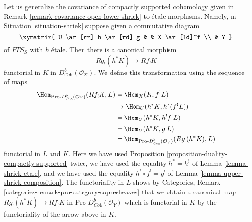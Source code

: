 \begin{remark}
\label{remark-covariance-etale-lower-shriek}
Let us generalize the covariance of compactly supported cohomology
given in Remark \ref{remark-covariance-open-lower-shriek}
to \'etale morphisms. Namely, in Situation \ref{situation-shriek}
suppose given a commutative diagram
$$
\xymatrix{
U \ar[rr]_h \ar[rd]_g & & X \ar[ld]^f \\
& Y
}
$$
of $\textit{FTS}_S$ with $h$ \'etale. Then there is a canonical morphism
$$
Rg_!(h^*K) \longrightarrow Rf_!K
$$
functorial in $K$ in $D^b_{\textit{Coh}}(\mathcal{O}_X)$. We define
this transformation using the sequence of maps
\begin{align*}
\Hom_{\text{Pro-}D^b_{\textit{Coh}}(\mathcal{O}_Y)}(Rf_!K, L)
& =
\Hom_X(K, f^!L) \\
& \to
\Hom_U(h^*K, h^*(f^!L)) \\
& =
\Hom_U(h^*K, h^!f^!L) \\
& =
\Hom_U(h^*K, g^!L) \\
& =
\Hom_{\text{Pro-}D^b_{\textit{Coh}}(\mathcal{O}_Y)}(Rg_!(h^*K), L)
\end{align*}
functorial in $L$ and $K$. Here we have used
Proposition \ref{proposition-duality-compactly-supported}
twice, we have used the equality $h^* = h^!$ of
Lemma \ref{lemma-shriek-etale}, and we have used the equality
$h^! \circ f^! = g^!$ of Lemma \ref{lemma-upper-shriek-composition}.
The functoriality in $L$ shows by
Categories, Remark \ref{categories-remark-pro-category-copresheaves}
that we obtain a canonical map $Rg_!(h^*K) \to Rf_!K$ in
$\text{Pro-}D^b_{\textit{Coh}}(\mathcal{O}_Y)$ which is
functorial in $K$ by the functoriality of the arrow above in $K$.
\end{remark}

